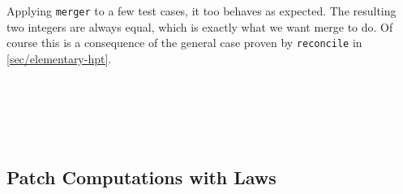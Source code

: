 Applying \texttt{merger} to a few test cases, it too behaves as expected.
The resulting two integers are always equal, which is exactly what we want merge to do.
Of course this is a consequence of the general case proven by \texttt{reconcile} in
\autoref{sec/elementary-hpt}.
\begin{code}%
%
\>[2]\AgdaFunction{\AgdaUnderscore{}}\AgdaSpace{}%
\AgdaSymbol{:}\AgdaSpace{}%
\AgdaSpace{}%
\AgdaSpace{}%
\AgdaSpace{}%
\AgdaSpace{}%
\AgdaSpace{}%
\AgdaSymbol{(}\AgdaSpace{}%
\AgdaOperator{\AgdaInductiveConstructor{,}}\AgdaSpace{}%
\AgdaSymbol{)}\<%
\\
%
\>[2]\AgdaSymbol{\AgdaUnderscore{}}\AgdaSpace{}%
\AgdaSymbol{=}\AgdaSpace{}%
\<%
\\
%
\\[\AgdaEmptyExtraSkip]%
%
\>[2]\AgdaFunction{\AgdaUnderscore{}}\AgdaSpace{}%
\AgdaSymbol{:}\AgdaSpace{}%
\AgdaSpace{}%
\AgdaSpace{}%
\AgdaSymbol{(}\AgdaSpace{}%
\AgdaSymbol{)}\AgdaSpace{}%
\AgdaSymbol{(}\AgdaSpace{}%
\AgdaSymbol{(}\AgdaSymbol{))}\AgdaSpace{}%
\AgdaSpace{}%
\AgdaSymbol{(}\AgdaSpace{}%
\AgdaOperator{\AgdaInductiveConstructor{,}}\AgdaSpace{}%
\AgdaSymbol{)}\<%
\\
%
\>[2]\AgdaSymbol{\AgdaUnderscore{}}\AgdaSpace{}%
\AgdaSymbol{=}\AgdaSpace{}%
\<%
\end{code}

\subsection{Patch Computations with Laws}

